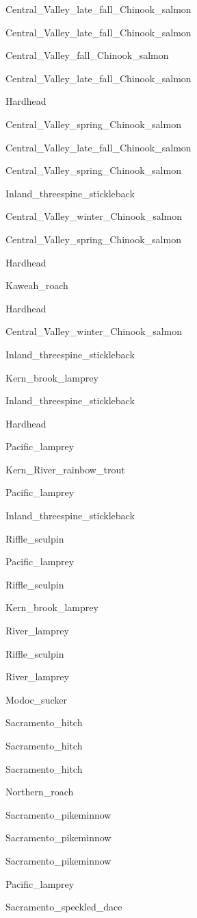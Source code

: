 \documentclass[]{article}
\begin{document}
Central\_Valley\_late\_fall\_Chinook\_salmon

Central\_Valley\_late\_fall\_Chinook\_salmon

Central\_Valley\_fall\_Chinook\_salmon

Central\_Valley\_late\_fall\_Chinook\_salmon

Hardhead

Central\_Valley\_spring\_Chinook\_salmon

Central\_Valley\_late\_fall\_Chinook\_salmon

Central\_Valley\_spring\_Chinook\_salmon

Inland\_threespine\_stickleback

Central\_Valley\_winter\_Chinook\_salmon

Central\_Valley\_spring\_Chinook\_salmon

Hardhead

Kaweah\_roach

Hardhead

Central\_Valley\_winter\_Chinook\_salmon

Inland\_threespine\_stickleback

Kern\_brook\_lamprey

Inland\_threespine\_stickleback

Hardhead

Pacific\_lamprey

Kern\_River\_rainbow\_trout

Pacific\_lamprey

Inland\_threespine\_stickleback

Riffle\_sculpin

Pacific\_lamprey

Riffle\_sculpin

Kern\_brook\_lamprey

River\_lamprey

Riffle\_sculpin

River\_lamprey

Modoc\_sucker

Sacramento\_hitch

Sacramento\_hitch

Sacramento\_hitch

Northern\_roach

Sacramento\_pikeminnow

Sacramento\_pikeminnow

Sacramento\_pikeminnow

Pacific\_lamprey

Sacramento\_speckled\_dace
\end{document}
